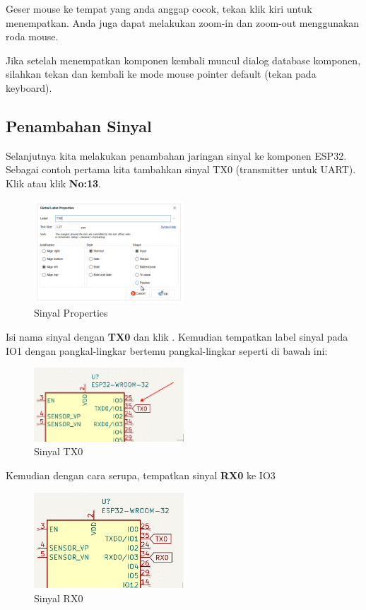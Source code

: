 \documentclass[12pt]{book}
\begin{document}
	Geser mouse ke tempat yang anda anggap cocok, tekan klik kiri untuk menempatkan.
	Anda juga dapat melakukan zoom-in dan zoom-out menggunakan roda mouse.

	Jika setelah menempatkan komponen kembali muncul dialog database komponen, silahkan tekan 
	dan kembali ke mode mouse pointer default (tekan  pada keyboard).

	\newpage
	\subsection{Penambahan Sinyal}

	Selanjutnya kita melakukan penambahan jaringan sinyal ke komponen ESP32.
	Sebagai contoh pertama kita tambahkan sinyal TX0 (transmitter untuk UART).
	Klik  atau klik \textbf{No:13}.

	\begin{figure}[!ht]
		\centering
		\includegraphics[width=0.5\textwidth]{images/sch/sch_4}
		\caption{Sinyal Properties}
	\end{figure}

	Isi nama sinyal dengan \textbf{TX0} dan klik .
	Kemudian tempatkan label sinyal pada IO1 dengan pangkal-lingkar bertemu pangkal-lingkar seperti di bawah ini:

	\begin{figure}[!ht]
		\centering
		\includegraphics[width=0.5\textwidth]{images/sch/sch_5}
		\caption{Sinyal TX0}
	\end{figure}

	Kemudian dengan cara serupa, tempatkan sinyal \textbf{RX0} ke IO3

	\begin{figure}[!ht]
		\centering
		\includegraphics[width=0.5\textwidth]{images/sch/sch_6}
		\caption{Sinyal RX0}
	\end{figure}
\end{document}
